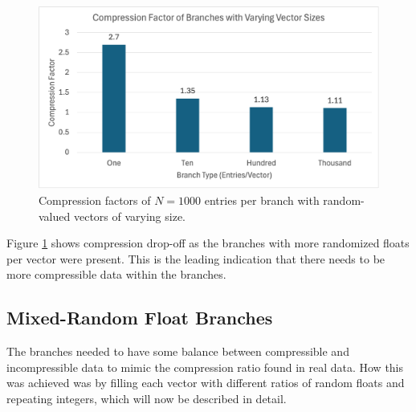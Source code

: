 \begin{figure}[h]
    \centering
    \includegraphics[width=.8\textwidth]{content/toymodel_content/branch_compfacts_nomix.png}
    \caption{Compression factors of $N=1000$ entries per branch with random-valued vectors of varying size.}
    \label{fig:toymodel_compF_rndm_vectors}
\end{figure}


Figure \ref{fig:toymodel_compF_rndm_vectors} shows compression drop-off as the branches with more randomized floats per vector were present.
This is the leading indication that there needs to be more compressible data within the branches. 

\subsection{Mixed-Random Float Branches}
The branches needed to have some balance between compressible and incompressible data to mimic the compression ratio found in real data.
How this was achieved was by filling each vector with different ratios of random floats and repeating integers, which will now be described in detail.

